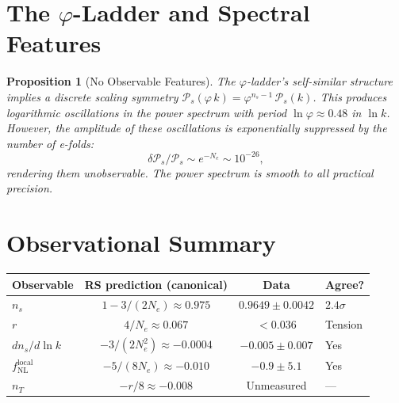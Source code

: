 \documentclass[12pt,a4paper]{article}
\newtheorem{proposition}[theorem]{Proposition}
\theoremstyle{definition}
\theoremstyle{remark}
\begin{document}
\section{The $\varphi$-Ladder and Spectral Features}
\label{sec:features}

\begin{proposition}[No Observable Features]
\label{prop:features}
The $\varphi$-ladder's self-similar structure implies a
discrete scaling symmetry
$\mathcal{P}_s(\varphi\,k) = \varphi^{n_s - 1}\,
\mathcal{P}_s(k)$.  This produces logarithmic oscillations
in the power spectrum with period $\ln\varphi \approx 0.48$
in $\ln k$.  However, the amplitude of these oscillations
is exponentially suppressed by the number of e-folds:
\begin{equation}
  \delta\mathcal{P}_s / \mathcal{P}_s \sim
  e^{-N_e} \sim 10^{-26},
\end{equation}
rendering them unobservable.  The power spectrum is
smooth to all practical precision.
\end{proposition}

\section{Observational Summary}
\label{sec:comparison}

\begin{center}
\renewcommand{\arraystretch}{1.3}
\begin{tabular}{@{}lccl@{}}
\toprule
\textbf{Observable} & \textbf{RS prediction (canonical)} &
\textbf{Data} & \textbf{Agree?} \\
\midrule
$n_s$ & $1 - 3/(2N_e) \approx 0.975$
& $0.9649 \pm 0.0042$ & $2.4\sigma$ \\
$r$ & $4/N_e \approx 0.067$
& $< 0.036$ & Tension \\
$dn_s/d\ln k$ & $-3/(2N_e^2) \approx -0.0004$
& $-0.005 \pm 0.007$ & Yes \\
$f_{\mathrm{NL}}^{\mathrm{local}}$
& $-5/(8N_e) \approx -0.010$
& $-0.9 \pm 5.1$ & Yes \\
$n_T$ & $-r/8 \approx -0.008$
& Unmeasured & --- \\
\bottomrule
\end{tabular}
\end{center}
\end{document}
